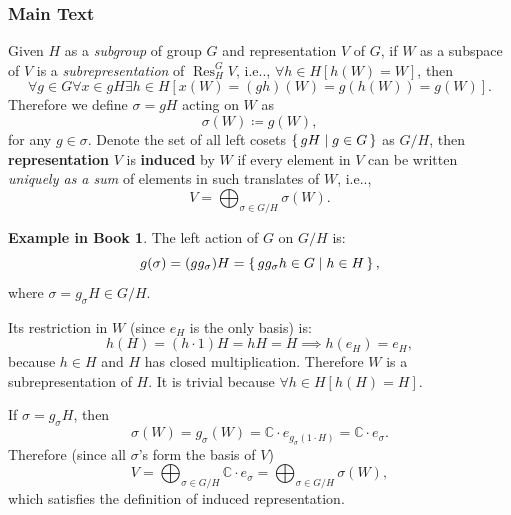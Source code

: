 \documentclass[12pt, letterpaper]{article}
\makeatletter
\newcommand{\co}{\mathbb{C}}
\newcommand{\Res}{\operatorname{Res}}
\newcommand\ie{i.e\@ifnextchar.{}{.\@}}
\newcommand{\define}{\coloneqq}
\theoremstyle{definition}
\theoremstyle{remark}
\theoremstyle{definition}
\newtheorem{exam}[exe]{Example in Book}
\theoremstyle{plain}
\numberwithin{equation}{section}
\makeatother
\begin{document}
	\subsubsection{Main Text}
	\begin{def*}
		Given $H$ as a \textit{subgroup} of group $G$ and representation $V$ of $G$,
		if $W$ as a subspace of $V$ is a \textit{subrepresentation} of $\Res_H^G V$,
		\ie, $\forall h \in H[h(W)=W]$, then
		\[\forall g\in G\forall x \in gH\exists h\in H[x(W) =(gh)(W) =g(h(W))=g(W) ].\]
		Therefore we define $\sigma=gH$ acting on $W$ as
		\[\sigma(W) \define g(W), \]
		for any $g\in\sigma$.
		Denote the set of all left cosets $\set{gH|g\in G}$ as $G/H$,
		then \textbf{representation} $V$ is \textbf{induced} by $W$ 
		if every element in $V$ can be written \textit{uniquely as a sum} of elements in such 
		translates of $W$, \ie, 
		\[V= \bigoplus_{\sigma\in G/H} \sigma( W).\]
	\end{def*}
	\begin{exam}\label{examPermOnCoset}
		The left action of $G$ on $G/H$ is:
		\[g(\sigma) = (gg_{\sigma})H=\set{gg_{\sigma}h\in G|h\in H}, \]
		where $\sigma=g_{\sigma}H\in G/H$.
		
		Its restriction in $W$ (since $e_H$ is the only basis) is:
		\[h(H)=(h\cdot 1)H=hH=H\implies h(e_H)=e_H, \]
		because $h\in H$ and $H$ has closed multiplication.
		Therefore $W$ is a subrepresentation of $H$.
		It is trivial because $\forall h\in H[h(H)=H]$.
		
		If $\sigma=g_{\sigma}H$, then 
		\[\sigma(W) =g_{\sigma}(W)=\co\cdot e_{g_{\sigma}(1\cdot H)}= \co\cdot e_{\sigma}.\]
		Therefore (since all $\sigma$'s form the basis of $V$)
		\[V=\bigoplus_{\sigma\in G/H}\co\cdot e_{\sigma}=\bigoplus_{\sigma\in G/H}\sigma(W), \]
		which satisfies the definition of induced representation.
	\end{exam}
	
\end{document}
